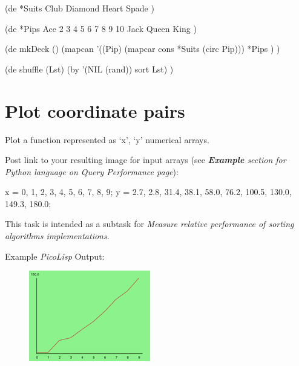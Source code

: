 \begin{wideverbatim}

(de *Suits
   Club Diamond Heart Spade )

(de *Pips
   Ace 2 3 4 5 6 7 8 9 10 Jack Queen King )

(de mkDeck ()
   (mapcan
      '((Pip) (mapcar cons *Suits (circ Pip)))
      *Pips ) )

(de shuffle (Lst)
   (by '(NIL (rand)) sort Lst) )

\end{wideverbatim}

\pagebreak{}
\section*{Plot coordinate pairs}

Plot a function represented as `x', `y' numerical arrays.

Post link to your resulting image for input arrays (see
\emph{\textbf{Example} section for Python
language on \emph{Query Performance} page}):

\begin{wideverbatim}
x = {0, 1, 2, 3, 4, 5, 6, 7, 8, 9};
y = {2.7, 2.8, 31.4, 38.1, 58.0, 76.2, 100.5, 130.0, 149.3, 180.0};
\end{wideverbatim}

This task is intended as a subtask for \emph{Measure relative
  performance of sorting algorithms implementations}.

\vspace{3cm}

Example \emph{PicoLisp} Output:

\begin{figure}[H]
  \centering
  \includegraphics{graphics/200px-Plotxy-picoLisp.png}
  \label{fig:plotxy-picolisp}
\end{figure}


